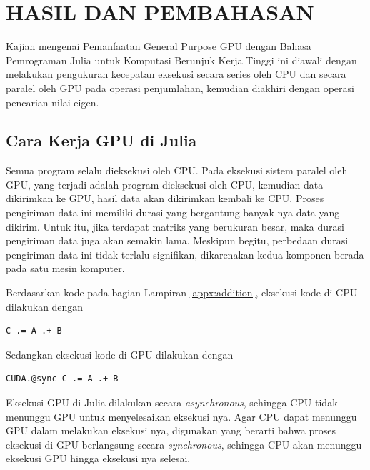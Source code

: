 \chapter{HASIL DAN PEMBAHASAN}

Kajian mengenai Pemanfaatan General Purpose GPU dengan Bahasa Pemrograman Julia untuk Komputasi Berunjuk Kerja Tinggi ini diawali dengan melakukan pengukuran kecepatan eksekusi secara series oleh CPU dan secara paralel oleh GPU pada operasi penjumlahan, kemudian diakhiri dengan operasi pencarian nilai eigen.


\section{Cara Kerja GPU di Julia}

Semua program selalu dieksekusi oleh CPU. Pada eksekusi sistem paralel oleh GPU, yang terjadi adalah program dieksekusi oleh CPU, kemudian data dikirimkan ke GPU, hasil data akan dikirimkan kembali ke CPU. Proses pengiriman data ini memiliki durasi yang bergantung banyak nya data yang dikirim. Untuk itu, jika terdapat matriks yang berukuran besar, maka durasi pengiriman data juga akan semakin lama. Meskipun begitu, perbedaan durasi pengiriman data ini tidak terlalu signifikan, dikarenakan kedua komponen berada pada satu mesin komputer.

Berdasarkan kode pada bagian Lampiran \ref{appx:addition}, eksekusi kode di CPU dilakukan dengan

\begin{lstlisting}
C .= A .+ B
\end{lstlisting}

\noindent
Sedangkan eksekusi kode di GPU dilakukan dengan

\begin{lstlisting}
CUDA.@sync C .= A .+ B
\end{lstlisting}

\noindent
Eksekusi GPU di Julia dilakukan secara \emph{asynchronous}, sehingga CPU tidak menunggu GPU untuk menyelesaikan eksekusi nya. Agar CPU dapat menunggu GPU dalam melakukan eksekusi nya, digunakan  yang berarti bahwa proses eksekusi di GPU berlangsung secara \emph{synchronous}, sehingga CPU akan menunggu eksekusi GPU hingga eksekusi nya selesai.

